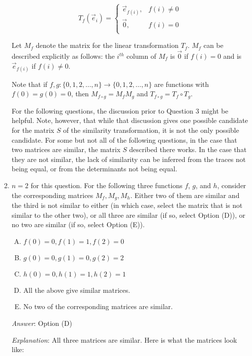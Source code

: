 \documentclass[10pt]{amsart}
\begin{document}
\begin{enumerate}
  $$T_f(\vec{e}_i) = \left \lbrace \begin{array}{rl} \vec{e}_{f(i)}, & f(i) \ne 0\\ \vec{0}, & f(i) = 0\\\end{array}\right.$$
    
    Let $M_f$ denote the matrix for the linear transformation $T_f$. $M_f$
    can be described explicitly as follows: the $i^{th}$ column of $M_f$
    is $\vec{0}$ if $f(i) = 0$ and is $\vec{e}_{f(i)}$ if $f(i) \ne 0$.
    
    Note that if $f,g: \{ 0,1,2,\dots,n \} \to \{ 0,1,2,\dots,n\}$ are
    functions with $f(0)= g(0) = 0$, then $M_{f \circ g} = M_fM_g$ and
    $T_{f \circ g} = T_f \circ T_g$.

    For the following questions, the discussion prior to Question 3
    might be helpful. Note, however, that while that discussion gives
    one possible candidate for the matrix $S$ of the similarity
    transformation, it is not the only possible candidate. For some
    but not all of the following questions, in the case that two
    matrices are similar, the matrix $S$ described there works. In the
    case that they are not similar, the lack of similarity can be
    inferred from the traces not being equal, or from the determinants
    not being equal.
    
\item $n = 2$ for this question. For the following three functions
  $f$, $g$, and $h$, consider the corresponding matrices
  $M_f,M_g,M_h$. Either two of them are similar and the third is not
  similar to either (in which case, select the matrix that is not
  similar to the other two), or all three are similar (if so, select
  Option (D)), or no two are similar (if so, select Option (E)).

  \begin{enumerate}[(A)]
  \item $f(0) = 0, f(1) = 1, f(2) = 0$
  \item $g(0) = 0, g(1) = 0, g(2) = 2$
  \item $h(0) = 0, h(1) = 1, h(2) = 1$
  \item All the above give similar matrices.
  \item No two of the corresponding matrices are similar.
  \end{enumerate}

  {\em Answer}: Option (D)

  {\em Explanation}: All three matrices are similar. Here is what the
  matrices look like:


\end{enumerate}
\end{document}
